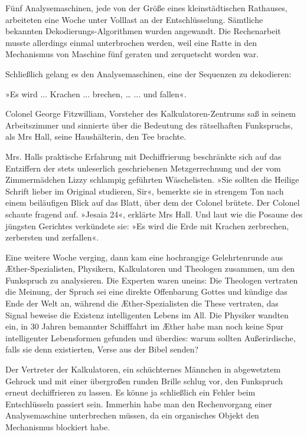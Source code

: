 \bigpar

Fünf Analysemaschinen, jede von der Größe eines kleinstädtischen
Rathauses, arbeiteten eine Woche unter Volllast an der
Entschlüsselung. Sämtliche bekannten Dekodierungs-Algorithmen
wurden angewandt. Die Rechenarbeit musste allerdings einmal
unterbrochen werden, weil eine Ratte in den Mechanismus von
Maschine fünf geraten und zerquetscht worden war.

\bigpar

Schließlich gelang es den Analysemaschinen, eine der Sequenzen zu
dekodieren:

»Es wird ... Krachen ... brechen, … ... und fallen«.

\bigpar

Colonel George Fitzwilliam, Vorsteher des Kalkulatoren-Zentrums saß
in seinem Arbeitszimmer und sinnierte über die Bedeutung des
rätselhaften Funkspruchs, als Mrs Hall, seine Haushälterin, den Tee
brachte.

Mrs. Halls praktische Erfahrung mit Dechiffrierung beschränkte sich
auf das Entziffern der stets unleserlich geschriebenen
Metzgerrechnung und der vom Zimmermädchen Lizzy schlampig geführten
Wäschelisten. »Sie sollten die Heilige Schrift lieber im Original
studieren, Sir«, bemerkte sie in strengem Ton nach einem
beiläufigen Blick auf das Blatt, über dem der Colonel brütete. Der
Colonel schaute fragend auf. »Jesaia 24«, erklärte Mrs Hall. Und
laut wie die Posaune des jüngsten Gerichtes verkündete sie: »Es
wird die Erde mit Krachen zerbrechen, zerbersten und zerfallen«.

\bigpar

Eine weitere Woche verging, dann kam eine hochrangige
Gelehrtenrunde aus Æther-Spezialisten, Physikern, Kalkulatoren und
Theologen zusammen, um den Funkspruch zu analysieren. Die Experten
waren uneins: Die Theologen vertraten die Meinung, der Spruch sei
eine direkte Offenbarung Gottes und kündige das Ende der Welt an,
während die Æther-Spezialisten die These vertraten, das Signal
beweise die Existenz intelligenten Lebens im All. Die Physiker
wandten ein, in 30 Jahren bemannter Schifffahrt im Æther habe man
noch keine Spur intelligenter Lebensformen gefunden und überdies:
warum sollten Außerirdische, falls sie denn existierten, Verse aus
der Bibel senden?

Der Vertreter der Kalkulatoren, ein schüchternes Männchen in
abgewetztem Gehrock und mit einer übergroßen runden Brille schlug
vor, den Funkspruch erneut dechiffrieren zu lassen. Es könne ja
schließlich ein Fehler beim Entschlüsseln passiert sein. Immerhin
habe man den Rechenvorgang einer Analysemaschine unterbrechen
müssen, da ein organisches Objekt den Mechanismus blockiert habe.

